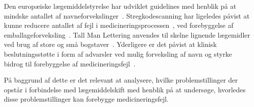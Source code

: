 Den europæiske lægemiddelstyrelse har udviklet guidelines med henblik på at mindske antallet af navneforvekslinger~\citep{DanskSelskabforPatientsikkerhed2009}.  Stregkodescanning har ligeledes påvist at kunne reducere antallet af fejl i medicineringsprocessen~\citep{Poon2006,Levtzion-korach2010}, ved forebyggelse af emballageforveksling~\citep{DanskSelskabforPatientsikkerhed2009}.  Tall Man Lettering anvendes til skelne lignende lægemidler ved brug af store og små bogstaver~\citep{Campmans2018}. Yderligere er det påvist at klinisk beslutningsstøtte i form af advarsler ved mulig forveksling af navn og styrke bidrog til forebyggelse af medicineringsfejl~\citep{Campmans2018}.

På baggrund af dette er det relevant at analysere, hvilke problemstillinger der opstår
i forbindelse med lægemiddelskift med henblik på at undersøge, hvorledes disse
problemstillinger kan forebygge medicineringsfejl. 


